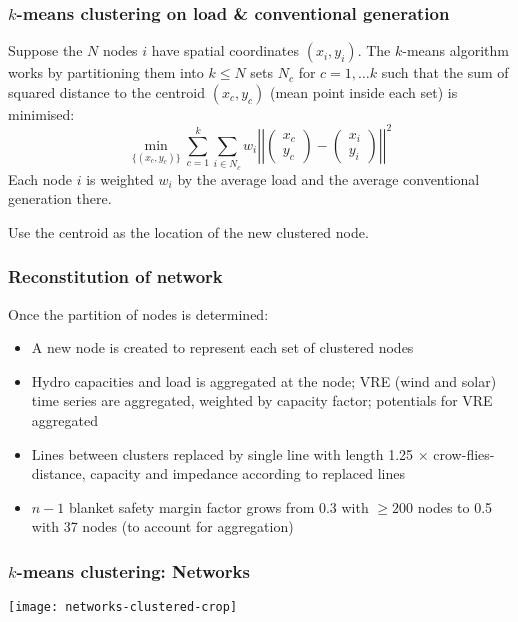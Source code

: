 \documentclass[10pt,aspectratio=169,dvipsnames]{beamer}
\let\olditem\item
\renewcommand{\item}{%
\olditem\vspace{5pt}}
\begin{document}
\begin{frame}
  \frametitle{$k$-means clustering on load \& conventional generation}

  Suppose the $N$ nodes $i$ have spatial coordinates $(x_i,y_i)$. The $k$-means algorithm works by partitioning them into $k\leq N$ sets $N_c$ for $c = 1, \dots k$ such that the sum of squared distance to the centroid $(x_c,y_c)$ (mean point inside each set) is minimised:
  \begin{equation*}
    \min_{\{(x_c,y_c)\}} \sum_{c=1}^k \sum_{i \in N_c} w_i \left|\left| \left(\begin{matrix}
      x_c \\
      y_c
\end{matrix}\right) -  \left(\begin{matrix}
      x_i \\
      y_i
\end{matrix}\right)\right|\right|^2
  \end{equation*}
  Each node $i$ is weighted $w_i$ by the average load and the
  average conventional generation there.

  Use the centroid as the location of the new clustered node.
\end{frame}



\begin{frame}
  \frametitle{Reconstitution of network}

  Once the partition of nodes is determined:
  \begin{itemize}
  \item A new node is created to represent each set of clustered nodes
  \item Hydro capacities and load is aggregated at the node; VRE (wind and solar) time series are aggregated, weighted by capacity factor; potentials for VRE aggregated
  \item Lines between clusters replaced by single line with length 1.25 $\times$ crow-flies-distance, capacity and impedance according to replaced lines
    \item $n-1$ blanket safety margin factor grows from 0.3 with $\geq 200$ nodes to 0.5 with 37 nodes (to account for aggregation)
  \end{itemize}

\end{frame}

\begin{frame}
  \frametitle{$k$-means clustering: Networks}

\centering
 \texttt{[image: networks-clustered-crop]}



\end{frame}
\end{document}
